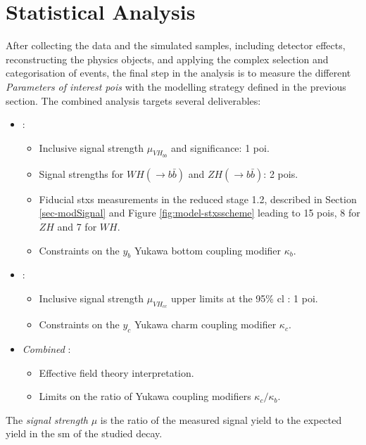 \section{Statistical Analysis}\label{sec-fitFramework}
After collecting the data and the simulated samples, including detector effects, reconstructing the physics objects, and applying the complex selection and categorisation of events, the final step in the analysis is to measure the different \textit{Parameters of interest \glspl{poi}} with the modelling strategy defined in the previous section. The combined analysis targets several deliverables:
\begin{itemize}[leftmargin=*]
\item \textit{\vhb}: 
    \begin{itemize}
        \item Inclusive signal strength $\mu_{VH_{bb}}$ and significance: 1 \gls{poi}.
        \item Signal strengths for $WH(\rightarrow b\bar{b})$ and $ZH(\rightarrow b\bar{b})$: 2 \glspl{poi}.
        \item Fiducial \gls{stxs} measurements in the reduced stage 1.2, described in Section \ref{sec-modSignal} and Figure \ref{fig:model-stxsscheme} leading to 15 \glspl{poi}, 8 for $ZH$ and 7 for $WH$.
        \item Constraints on the $y_b$ Yukawa bottom coupling modifier $\kappa_b$. 
    \end{itemize}
\item \textit{\vhc}:
    \begin{itemize}
        \item Inclusive signal strength $\mu_{VH_{cc}}$ upper limits at the 95\% \gls{cl} : 1 \gls{poi}.
        \item Constraints on the $y_c$ Yukawa charm coupling modifier $\kappa_c$. 
    \end{itemize}
\item \textit{Combined \vhbc}: 
    \begin{itemize}
        \item Effective field theory interpretation.
        \item Limits on the ratio of Yukawa coupling modifiers $\kappa_c / \kappa_b$.
    \end{itemize}
\end{itemize}

The \textit{signal strength} $\mu$ is the ratio of the measured signal yield to the expected yield in the \gls{sm} of the studied decay.

